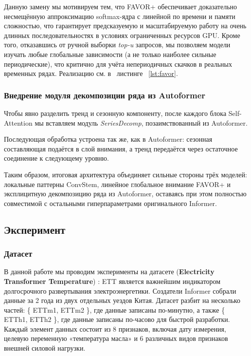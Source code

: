 Данную замену мы мотивируем тем, что FAVOR+ обеспечивает доказательно 
несмещённую аппроксимацию softmax-ядра с линейной по времени и памяти 
сложностью, что гарантирует предсказуемую и масштабируемую работу на очень 
длинных последовательностях в условиях ограниченных ресурсов GPU. Кроме того, 
отказавшись от ручной выборки \textit{top-u} запросов, мы позволяем модели изучать 
любые глобальные зависимости (а не только наиболее сильные периодические), 
что критично для учёта непериодичных скачков в реальных временных рядах.
Реализацию см. в ~листинге~ \ref{lst:favor}.


\subsubsection{Внедрение модуля декомпозиции ряда из Autoformer}

Чтобы явно разделить тренд и сезонную компоненту, после каждого блока
Self-Attention мы вставляем модуль \textit{SeriesDecomp}, позаимствованный из
Autoformer.

Последующая обработка устроена так же, как в Autoformer: сезонная составляющая
подаётся в слой внимания, а тренд передаётся через остаточное соединение к
следующему уровню.

Таким образом, итоговая архитектура объединяет сильные стороны трёх моделей:
локальные паттерны ConvStem, линейное глобальное внимание FAVOR+ и эксплицитную
декомпозицию ряда из Autoformer, оставаясь при этом полностью совместимой с
остальными гиперпараметрами оригинального Informer.

\subsection{Эксперимент}

\subsubsection{Датасет}

В данной работе мы проводим эксперименты на датасете 
(\textbf{Electricity Transformer Temperature}) \cite{informer}:
ETT является важнейшим индикатором долгосрочного развертывания 
электроэнергетики. Создатели Informer собрали данные за 
2 года из двух отдельных уездов Китая. Датасет разбит на несколько 
частей: \{ ETTm1, ETTm2 \}, где данные записаны по-минутно, а 
также \{ ETTh1, ETTh2 \}, где данные записаны по-часово 
для быстрой разработки. Каждый элемент данных состоит из 
8 признаков, включая дату измерения, целевую переменную 
«температура масла» и 6 различных видов признаков внешней силовой 
нагрузки.  

